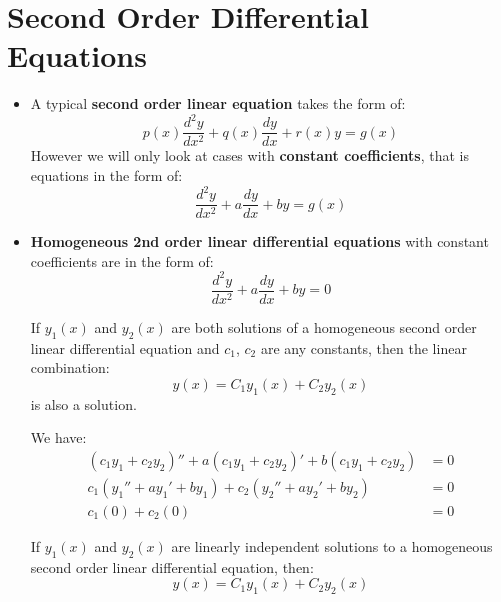 \section{Second Order Differential Equations}
\begin{itemize}
    \item A typical \textbf{second order linear equation} takes the form of:
    \begin{equation}
        p(x)\frac{d^2y}{dx^2} + q(x)\frac{dy}{dx} + r(x)y = g(x)
        \label{eq:}
    \end{equation}
    However we will only look at cases with \textbf{constant coefficients}, that is equations in the form of:
    \begin{equation}
        \frac{d^2y}{dx^2} + a\frac{dy}{dx} + by = g(x)
        \label{eq:}
    \end{equation}
    \item \textbf{Homogeneous 2nd order linear differential equations} with constant coefficients are in the form of:
    \begin{equation}
        \frac{d^2y}{dx^2} + a\frac{dy}{dx}+by= 0
        \label{eq:}
    \end{equation}
    \begin{theorem}
        If $y_1(x)$ and $y_2(x)$ are both solutions of a homogeneous second order linear differential equation and $c_1$, $c_2$ are any constants, then the linear combination:
        \begin{equation}
            y(x) = C_1y_1(x) + C_2y_2(x)
            \label{eq:}
        \end{equation}
        is also a solution.
    \end{theorem}
    \begin{prooof}
        We have:
        \begin{align}
            (c_1y_1+c_2y_2)'' + a(c_1y_1+c_2y_2)' + b(c_1y_1+c_2y_2) &= 0 \\ 
            c_1(y_1''+ay_1'+by_1) + c_2(y_2''+ay_2'+by_2) &= 0 \\ 
            c_1(0) + c_2(0) &= 0
        \end{align}
    \end{prooof}
    \begin{theorem}
        If $y_1(x)$ and $y_2(x)$ are linearly independent solutions to a homogeneous second order linear differential equation, then:
        \begin{equation}
            y(x) = C_1y_1(x) + C_2y_2(x)
            \label{eq:}
        \end{equation}

\end{theorem}
\end{itemize}
